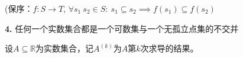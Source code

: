 \documentclass[UTF8, 9pt, a4paper]{ctexart}
\newcommand{\ksec}[2]{\noindent \textbf{\large #1} #2\par}
\newcommand{\kspace}{\vspace{0.5cm}}
\begin{document}
	
	
	
	
	

	(保序：$ f: S \rightarrow T $, $ \forall s_1\ s_2 \in S:\ s_1 \subseteq  s_2 \implies f(s_1) \subseteq f(s_2)\ $
	
	\kspace
	
	\begin{comment}
		
	
	暂时将“序”使用$ \leq, \geq $符号\\
	$ \forall x \ y\in \alpha:\ x \leq y \implies f(x) \leq f(y) $\\
	$ \forall x \ y\in \beta:\ x \leq y \implies f^{-1}(x) \leq f^{-1}(y) $\\
	
	考虑1,2 -> 3,4, 利用序数的性质证明$ \forall x\ y\in \alpha:\ f(x) = x $, 反证？能推出什么矛盾？
	
	$ \forall x \in \alpha:\ x \in \beta $\\
	$ \forall x \in \beta:\ x \in \alpha $\\
	$ \alpha \subseteq \beta \land \beta \subseteq \alpha $\\
	$ \forall a \in \texttt{dom}(f):\ f(a) = a $，由恒等映射的性质，其是双射。\\
	
	\end{comment}
	
	
	\vspace{0.5cm}
	
	\ksec{4. }{任何一个实数集合都是一个可数集与一个无孤立点集的不交并}
	
	设$ A \subseteq \mathbb{R} $为实数集合，记$ A^{(k)} $为$ A $第$ k $次求导的结果。
	
\end{document}
